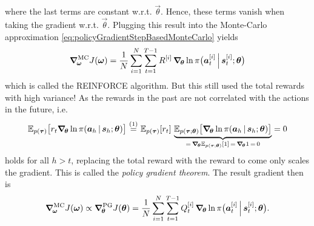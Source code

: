 					where the last terms are constant w.r.t. \(\vec{\theta}\). Hence, these terms vanish when taking the gradient w.r.t. \(\vec{\theta}\). Plugging this result into the Monte-Carlo approximation \eqref{eq:policyGradientStepBasedMonteCarlo} yields
					\begin{equation*}
						\grad_{\!\bm{\omega}}^\mathrm{MC} J(\bm{\omega})
						= \frac{1}{N} \sum_{i = 1}^{N} \sum_{t = 1}^{T - 1} R^{[i]} \, \grad_{\!\bm{\theta}} \ln \pi\big(\bm{a}_t^{[i]} \,\Big\vert\, \bm{s}_t^{[i]}; \bm{\theta}\big)
					\end{equation*}
					which is called the REINFORCE algorithm. But this still used the total rewards with high variance! As the rewards in the past are not correlated with the actions in the future, i.e.
					\begin{equation*}
						\E_{p(\vec{\tau})}\big[ r_t \grad_{\!\vec{\theta}} \ln \pi(\vec{a}_h \given \vec{s}_h; \vec{\theta}) \big]
						\,\oversetfootnotemark{=}\, \E_{p(\vec{\tau})}[r_t] \, \underbrace{\E_{p(\vec{\tau}; \vec{\theta})}\big[ \grad_{\!\vec{\theta}} \ln \pi(\vec{a}_h \given \vec{s}_h; \vec{\theta}) \big]}_{\mathclap{=\, \grad_{\!\vec{\theta}} \E_{p(\vec{\tau}; \vec{\theta})}[1] \,=\, \grad_{\!\vec{\theta}} 1 \,=\, 0}}
						= 0
					\end{equation*}
					holds for all \( h > t \), replacing the total reward with the reward to come only scales the gradient. This is called the \emph{policy gradient theorem}. The result gradient then is
					\begin{equation*}
						\grad_{\!\bm{\omega}}^\mathrm{MC} J(\bm{\omega})
						\propto \grad_{\!\bm{\theta}}^\mathrm{PG} J(\bm{\theta})
						= \frac{1}{N} \sum_{i = 1}^{N} \sum_{t = 1}^{T - 1} Q_t^{[i]} \, \grad_{\!\bm{\theta}} \ln \pi\big(\bm{a}_t^{[i]} \,\Big\vert\, \bm{s}_t^{[i]}; \bm{\theta}\big).
					\end{equation*}


